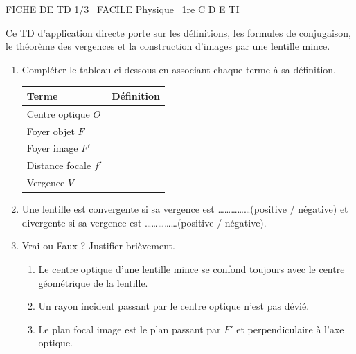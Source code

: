 \documentclass[11pt]{article}
\begin{document}
\begin{tcolorbox}[enhanced,colback=popink,colframe=popink,arc=10pt,boxrule=0pt,left=12pt,right=12pt,top=9pt,bottom=9pt]
{\color{white}\popxbold\small FICHE DE TD 1/3 \textbullet\ FACILE \hfill Physique \textbullet\ 1re C D E TI\par}
\end{tcolorbox}
\vspace{4pt}
Ce TD d'application directe porte sur les définitions, les formules de conjugaison, le théorème des vergences et la construction d'images par une lentille mince.

\begin{exercice}
\begin{enumerate}
    \item Compléter le tableau ci-dessous en associant chaque terme à sa définition.
    \begin{tabular}{|p{3.5cm}|p{11cm}|}
    \hline
    \textbf{Terme} & \textbf{Définition} \\ \hline
    Centre optique $O$ & \\ \hline
    Foyer objet $F$ & \\ \hline
    Foyer image $F'$ & \\ \hline
    Distance focale $f'$ & \\ \hline
    Vergence $V$ & \\ \hline
    \end{tabular}
    \item Une lentille est convergente si sa vergence est \ldots\ldots\ldots\ldots\ldots (positive / négative) et divergente si sa vergence est \ldots\ldots\ldots\ldots\ldots (positive / négative).
    \item Vrai ou Faux ? Justifier brièvement.
    \begin{enumerate}
        \item Le centre optique d'une lentille mince se confond toujours avec le centre géométrique de la lentille.
        \item Un rayon incident passant par le centre optique n'est pas dévié.
        \item Le plan focal image est le plan passant par $F'$ et perpendiculaire à l'axe optique.
    \end{enumerate}
\end{enumerate}
\end{exercice}
\end{document}
